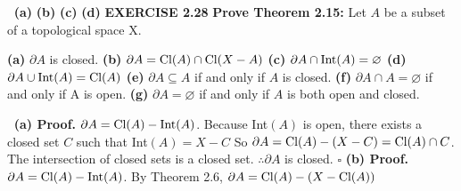 \documentclass[12pt]{article}
\begin{document}
\(\ \) \newline
\textbf{(a)}  \newline
\textbf{(b)}  \newline
\textbf{(c)}  \newline
\textbf{(d)} 
\newpage
\textbf{EXERCISE 2.28} \textbf{Prove Theorem 2.15:} Let \(A\) be a subset of a topological space X.
\begin{adjustwidth}{1cm}{0cm}
  \begin{flushleft}
    \textbf{(a)} \(\partial A\) is closed. \newline
    \textbf{(b)} \(\partial A = \textup{Cl}(A) \cap \textup{Cl}(X-A)\) \newline
    \textbf{(c)} \(\partial A \cap \textup{Int}(A) = \varnothing\) \newline
    \textbf{(d)} \(\partial A \cup \textup{Int}(A) = \textup{Cl}(A)\) \newline
    \textbf{(e)} \(\partial A \subseteq A\) if and only if \(A\) is closed. \newline
    \textbf{(f)} \(\partial A \cap A = \varnothing\) if and only if A is open. \newline
    \textbf{(g)} \(\partial A = \varnothing\) if and only if \(A\) is both open and closed.
  \end{flushleft}
\end{adjustwidth}
\(\ \) \newline
\textbf{(a) Proof.} \newline
\(\partial A = \textup{Cl}(A) - \textup{Int}(A)\).
\newline
Because Int\((A)\) is open, there exists a closed set \(C\) such that Int\((A) = X - C\)
\newline
So \(\partial A = \textup{Cl}(A) - (X - C) = \textup{Cl}(A) \cap C\). \newline
The intersection of closed sets is a closed set. \newline
\(\therefore \partial A\) is closed.
\newline \(\square\) \newline \newline
\textbf{(b) Proof.} \newline
\(\partial A = \textup{Cl}(A) - \textup{Int}(A)\).
\newline
By Theorem 2.6, \(\partial A =  \textup{Cl}(A) - (X - \textup{Cl}(A))\)
\end{document}
